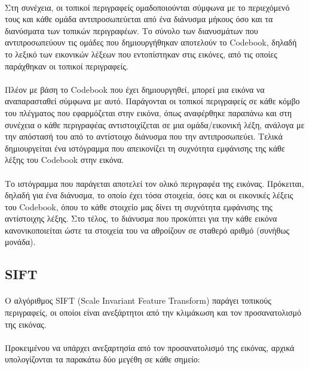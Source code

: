 \paragraph*{}
Στη συνέχεια, οι τοπικοί περιγραφείς ομαδοποιούνται σύμφωνα με το περιεχόμενό τους και κάθε ομάδα αντιπροσωπεύεται από ένα διάνυσμα μήκους όσο και τα διανύσματα των τοπικών περιγραφέων. Το σύνολο των διανυσμάτων που αντιπροσωπεύουν τις ομάδες που δημιουργήθηκαν αποτελούν το Codebook, δηλαδή το λεξικό των εικονικών λέξεων που εντοπίστηκαν στις εικόνες, από τις οποίες παράχθηκαν οι τοπικοί περιγραφείς.

\paragraph*{}
Πλέον με βάση το Codebook που έχει δημιουργηθεί, μπορεί μια εικόνα να αναπαρασταθεί σύμφωνα με αυτό. Παράγονται οι τοπικοί περιγραφείς σε κάθε κόμβο του πλέγματος που εφαρμόζεται στην εικόνα, όπως αναφέρθηκε παραπάνω και στη συνέχεια ο κάθε περιγραφέας αντιστοιχίζεται σε μια ομάδα/εικονική λέξη, ανάλογα με την απόστασή του από το αντίστοιχο διάνυσμα που την αντιπροσωπεύει. Τελικά δημιουργείται ένα ιστόγραμμα που απεικονίζει τη συχνότητα εμφάνισης της κάθε λέξης του Codebook στην εικόνα.

\paragraph*{}
Το ιστόγραμμα που παράγεται αποτελεί τον ολικό περιγραφέα της εικόνας. Πρόκειται, δηλαδή για ένα διάνυσμα, το οποίο έχει τόσα στοιχεία, όσες και οι εικονικές λέξεις του Codebook, όπου το κάθε στοιχείο μας δίνει τη συχνότητα εμφάνισης της αντίστοιχης λέξης. Στο τέλος, το διάνυσμα που προκύπτει για την κάθε εικόνα κανονικοποιείται ώστε τα στοιχεία του να αθροίζουν σε σταθερό αριθμό (συνήθως μονάδα).


\subsection{SIFT} \label{subsec:sift}
\paragraph*{}
Ο αλγόριθμος SIFT \cite{sift} (Scale Invariant Feature Transform) παράγει τοπικούς περιγραφείς, οι οποίοι είναι ανεξάρτητοι από την κλιμάκωση και τον προσανατολισμό της εικόνας.
\paragraph*{}
Προκειμένου να υπάρχει ανεξαρτησία από τον προσανατολισμό της εικόνας, αρχικά υπολογίζονται τα παρακάτω δύο μεγέθη σε κάθε σημείο:

